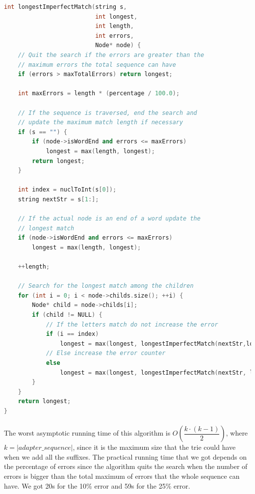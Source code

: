 \documentclass[a4paper,10pt]{article}
\begin{document}
\begin{lstlisting}[language=c++, caption=Recursive algorithm for imperfect suffix-prefix match, label=im]
int longestImperfectMatch(string s,
                          int longest,
                          int length,
                          int errors,
                          Node* node) {
    // Quit the search if the errors are greater than the
    // maximum errors the total sequence can have
    if (errors > maxTotalErrors) return longest;

    int maxErrors = length * (percentage / 100.0);

    // If the sequence is traversed, end the search and
    // update the maximum match length if necessary
    if (s == "") {
        if (node->isWordEnd and errors <= maxErrors) 
            longest = max(length, longest);
        return longest;
    }

    int index = nuclToInt(s[0]);
    string nextStr = s[1:];

    // If the actual node is an end of a word update the 
    // longest match
    if (node->isWordEnd and errors <= maxErrors) 
        longest = max(length, longest);

    ++length;

    // Search for the longest match among the children
    for (int i = 0; i < node->childs.size(); ++i) {
        Node* child = node->childs[i];
        if (child != NULL) {
            // If the letters match do not increase the error
            if (i == index) 
                longest = max(longest, longestImperfectMatch(nextStr,longest, length, errors, child));
            // Else increase the error counter
            else 
                longest = max(longest, longestImperfectMatch(nextStr, longest, length, errors+1, child));
        }
    }
    return longest;
}
\end{lstlisting}

\paragraph{} \label{rn-im} The worst asymptotic running time of this algorithm is $O(\dfrac{k\cdot(k-1)} {2})$, where $k = |adapter\_sequence|$, since it is the maximum size that the trie could have when we add all the suffixes.
The practical running time that we got depends on the percentage of errors since the algorithm quits the search when the number of errors is bigger than the total maximum of errors that the whole sequence can have.
We got 20s for the 10\% error and 59s for the 25\% error.
\end{document}
